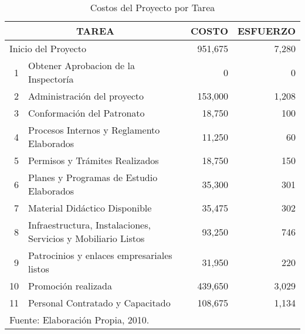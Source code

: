 \begin{table}
    \centering
    \caption{Costos del Proyecto por Tarea}
    \label{tbl:Proy:Costos}
    \footnotesize
    \begin{tabular}{r|l|r|r}
        \multicolumn{2}{c|}{TAREA}                                         & COSTO   & ESFUERZO \\ 
        \hline
        \hline
        \multicolumn{2}{l|}{Inicio del Proyecto}                           & 951,675 & 7,280    \\ 
        \hline
         1 & Obtener Aprobacion de la Inspector\'ia                        & 0       & 0        \\ 
         2 & Administraci\'on del proyecto                                 & 153,000 & 1,208    \\ 
         3 & Conformación del Patronato                                    & 18,750  & 100      \\ 
         4 & Procesos Internos y Reglamento Elaborados                     & 11,250  & 60       \\ 
         5 & Permisos y Tr\'amites Realizados                              & 18,750  & 150      \\ 
         6 & Planes y Programas de Estudio Elaborados                      & 35,300  & 301      \\ 
         7 & Material Did\'actico Disponible                               & 35,475  & 302      \\ 
         8 & Infraestructura, Instalaciones, Servicios y Mobiliario Listos & 93,250  & 746      \\ 
         9 & Patrocinios y enlaces empresariales listos                    & 31,950  & 220      \\ 
        10 & Promoci\'on realizada                                         & 439,650 & 3,029    \\ 
        11 & Personal Contratado y Capacitado                              & 108,675 & 1,134    \\ 
        \hline
        \multicolumn{4}{l}{\footnotesize Fuente: Elaboración Propia, 2010.}
    \end{tabular}
\end{table}
